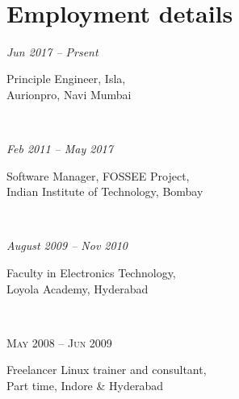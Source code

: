\documentclass[10pt]{article} %
\begin{document}
\color{text1} %


\par{\\ %


\begin{minipage}[t]{0.5\textwidth} %
\vspace{0pt} %


\section{Employment details}

\smallskip
{\raggedright\textit{Jun 2017 -- Prsent}\par}
{\raggedright\large Principle Engineer, Isla, \\
Aurionpro, Navi Mumbai}\\
\smallskip

\smallskip
{\raggedright\textit{Feb 2011 -- May 2017}\par}
{\raggedright\large Software Manager, FOSSEE Project, \\
Indian Institute of Technology, Bombay}\\
\smallskip

{\raggedright\textit{August 2009 -- Nov 2010}\par}
{\raggedright\large Faculty in Electronics Technology, \\
Loyola Academy, Hyderabad}\\
\smallskip

{\raggedright\textsc{May 2008 -- Jun 2009}\par}
{\raggedright\large Freelancer Linux trainer and consultant, \\
Part time, Indore \& Hyderabad}\\


\end{minipage}}
\end{document}
